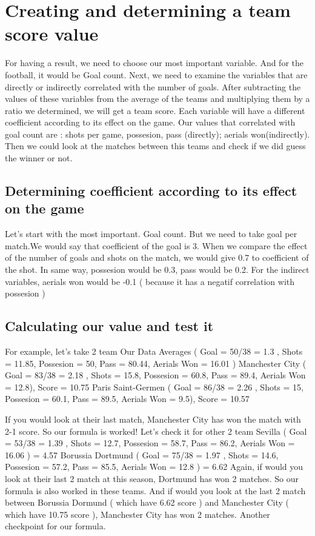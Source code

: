 \documentclass[conference]{IEEEtran}
\begin{document}
\section{Creating and determining a team score value}
For having a result, we need to choose our most important variable. And for the football, it would be Goal count. Next, we need to examine the variables that are directly or indirectly correlated with the number of goals. After subtracting the values of these variables from the average of the teams and multiplying them by a ratio we determined, we will get a team score. Each variable will have a different coefficient according to its effect on the game. Our values that correlated with goal count are :
shots per game, possesion, pass (directly); aerials won(indirectly). Then we could look at the matches between this teams and check if we did guess the winner or not.
\subsection{Determining coefficient according to its effect on the game}
Let's start with the most important. Goal count. But we need to take goal per match.We would say that coefficient of the goal is 3. When we compare the effect of the number of goals and shots on the match, we would give 0.7 to coefficient of the shot. In same way, possesion would be 0.3, pass would be 0.2. For the indirect variables, aerials won would be -0.1 ( because it has a negatif correlation with possesion )
\subsection{Calculating our value and test it}
For example, let's take 2 team \newline
Our Data Averages ( Goal = 50/38 = 1.3  ,  Shots = 11.85, Possesion = 50, Pass = 80.44, Aerials Won = 16.01 ) \newline
Manchester City ( Goal = 83/38 = 2.18 , Shots = 15.8, Possesion = 60.8, Pass = 89.4, Aerials Won = 12.8), Score = 10.75  \newline
Paris Saint-Germen  ( Goal = 86/38 = 2.26 , Shots = 15, Possesion = 60.1, Pass = 89.5, Aerials Won = 9.5), Score = 10.57  \newline

If you would look at their last match, Manchester City has won the match with 2-1 score. So our formula is worked! Let's check it for other 2 team \newline
Sevilla ( Goal = 53/38 = 1.39  ,  Shots = 12.7, Possesion = 58.7, Pass = 86.2, Aerials Won = 16.06 ) = 4.57 \newline
Borussia Dortmund ( Goal = 75/38 = 1.97  ,  Shots = 14.6, Possesion = 57.2, Pass = 85.5, Aerials Won = 12.8 ) = 6.62 \newline
Again, if would you look at their last 2 match at this season, Dortmund has won 2 matches. So our formula is also worked in these teams.\newline
And if would you look at the last 2 match between Borussia Dormund ( which have 6.62 score ) and Manchester City ( which have 10.75 score ), Manchester City has won 2 matches. Another checkpoint for our formula.
\end{document}
